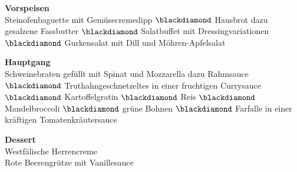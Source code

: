 \Centering
\vspace{0.3em}
	\noindent \textbf{Vorspeisen}\\
	Steinofenbaguette mit Gemüsecremedipp $\blackdiamond$ Hausbrot dazu gesalzene Fassbutter $\blackdiamond$ 
	Salatbuffet mit Dressingvariationen $\blackdiamond$
	Gurkensalat mit Dill und Möhren-Apfelsalat
	
	\vspace{0.3em}\noindent \textbf{Hauptgang}\\
	Schweinebraten gefüllt mit Spinat und Mozzarella dazu Rahmsauce $\blackdiamond$
	Truthahngeschnetzeltes in einer fruchtigen Currysauce $\blackdiamond$
	Kartoffelgratin $\blackdiamond$ Reis $\blackdiamond$
	Mandelbroccoli $\blackdiamond$ grüne Bohnen $\blackdiamond$
	Farfalle in einer kräftigen Tomatenkräutersauce
	
	\vspace{0.3em}\noindent \textbf{Dessert}\\
	Westfälische Herrencreme \\
	Rote Beerengrütze mit Vanillesauce

\justifying


